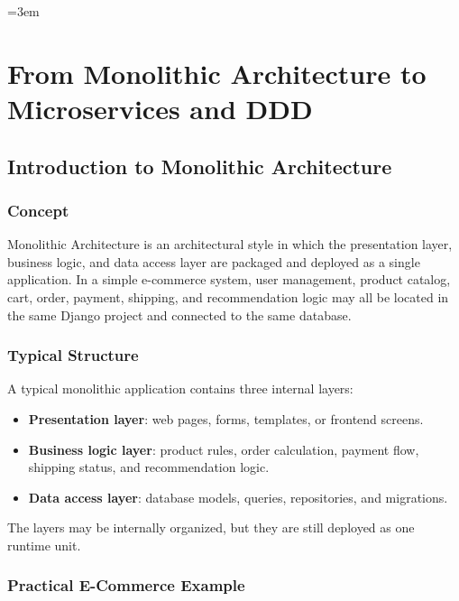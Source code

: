 \documentclass[12pt,a4paper]{article}
\begin{document}
\emergencystretch=3em

\tableofcontents
\newpage
\listoffigures
\listoftables
\newpage

\section{From Monolithic Architecture to Microservices and DDD}

\subsection{Introduction to Monolithic Architecture}

\subsubsection{Concept}

Monolithic Architecture is an architectural style in which the presentation layer, business logic, and data access layer are packaged and deployed as a single application. In a simple e-commerce system, user management, product catalog, cart, order, payment, shipping, and recommendation logic may all be located in the same Django project and connected to the same database.

\subsubsection{Typical Structure}

A typical monolithic application contains three internal layers:

\begin{itemize}
    \item \textbf{Presentation layer}: web pages, forms, templates, or frontend screens.
    \item \textbf{Business logic layer}: product rules, order calculation, payment flow, shipping status, and recommendation logic.
    \item \textbf{Data access layer}: database models, queries, repositories, and migrations.
\end{itemize}

The layers may be internally organized, but they are still deployed as one runtime unit.

\subsubsection{Practical E-Commerce Example}
\end{document}
